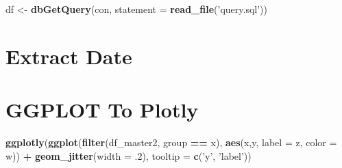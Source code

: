 \documentclass[]{book}
\newenvironment{Shaded}{\begin{snugshade}}{\end{snugshade}}
\newcommand{\DataTypeTok}[1]{\textcolor[rgb]{0.13,0.29,0.53}{#1}}
\newcommand{\FloatTok}[1]{\textcolor[rgb]{0.00,0.00,0.81}{#1}}
\newcommand{\KeywordTok}[1]{\textcolor[rgb]{0.13,0.29,0.53}{\textbf{#1}}}
\newcommand{\NormalTok}[1]{#1}
\newcommand{\OperatorTok}[1]{\textcolor[rgb]{0.81,0.36,0.00}{\textbf{#1}}}
\newcommand{\StringTok}[1]{\textcolor[rgb]{0.31,0.60,0.02}{#1}}
\begin{document}
\begin{Shaded}
\begin{Highlighting}[]
\NormalTok{df <-}\StringTok{ }\KeywordTok{dbGetQuery}\NormalTok{(con, }\DataTypeTok{statement =} \KeywordTok{read_file}\NormalTok{(}\StringTok{'query.sql'}\NormalTok{))}
\end{Highlighting}
\end{Shaded}

\hypertarget{extract-date}{%
\section{Extract Date}\label{extract-date}}

\begin{Shaded}
\end{Shaded}

\hypertarget{ggplot-to-plotly}{%
\section{GGPLOT To Plotly}\label{ggplot-to-plotly}}

\begin{Shaded}
\begin{Highlighting}[]
\KeywordTok{ggplotly}\NormalTok{(}\KeywordTok{ggplot}\NormalTok{(}\KeywordTok{filter}\NormalTok{(df_master2, group }\OperatorTok{==}\StringTok{ }\NormalTok{x), }\KeywordTok{aes}\NormalTok{(x,y, }\DataTypeTok{label =}\NormalTok{ z, }\DataTypeTok{color =}\NormalTok{ w)) }\OperatorTok{+}
\StringTok{        }\KeywordTok{geom_jitter}\NormalTok{(}\DataTypeTok{width =} \FloatTok{.2}\NormalTok{), }\DataTypeTok{tooltip =} \KeywordTok{c}\NormalTok{(}\StringTok{'y'}\NormalTok{, }\StringTok{'label'}\NormalTok{))}
\end{Highlighting}
\end{Shaded}
\end{document}

